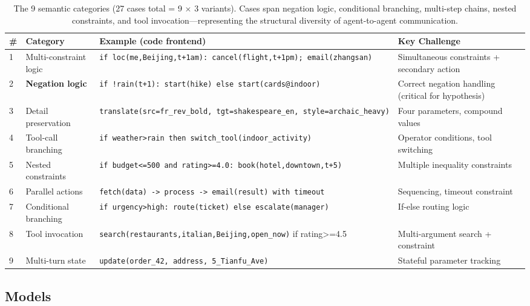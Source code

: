 \documentclass{article}
\begin{document}
\begin{table}[ht]
\centering
\footnotesize
\caption{The 9 semantic categories (27 cases total = 9 $\times$ 3 variants). Cases span negation logic, conditional branching, multi-step chains, nested constraints, and tool invocation---representing the structural diversity of agent-to-agent communication.}
\begin{tabular}{l>{\raggedright\arraybackslash}p{2cm}>{\raggedright\arraybackslash}p{9cm}>{\raggedright\arraybackslash}p{2cm}}
\toprule
\# & Category & Example (code frontend) & Key Challenge \\
\midrule
1 & Multi-constraint logic & \texttt{if\ loc(me,Beijing,t+1am):\ cancel(flight,t+1pm);\ email(zhangsan)} & Simultaneous constraints + secondary action \\
2 & \textbf{Negation logic} & \texttt{if\ !rain(t+1):\ start(hike)\ else\ start(cards@indoor)} & Correct negation handling (critical for hypothesis) \\
3 & Detail preservation & \texttt{translate(src=fr\_rev\_bold,\ tgt=shakespeare\_en,\ style=archaic\_heavy)} & Four parameters, compound values \\
4 & Tool-call branching & \texttt{if\ weather>rain\ then\ switch\_tool(indoor\_activity)} & Operator conditions, tool switching \\
5 & Nested constraints & \texttt{if\ budget<=500\ and\ rating>=4.0:\ book(hotel,downtown,t+5)} & Multiple inequality constraints \\
6 & Parallel actions & \texttt{fetch(data)\ ->\ process\ ->\ email(result)\ with\ timeout} & Sequencing, timeout constraint \\
7 & Conditional branching & \texttt{if\ urgency>high:\ route(ticket)\ else\ escalate(manager)} & If-else routing logic \\
8 & Tool invocation & \texttt{search(restaurants,italian,Beijing,open\_now)} if rating\textgreater=4.5 & Multi-argument search + constraint \\
9 & Multi-turn state & \texttt{update(order\_42,\ address,\ 5\_Tianfu\_Ave)} & Stateful parameter tracking \\
\bottomrule
\end{tabular}
\end{table}


\subsection{Models}\label{models}
\end{document}
